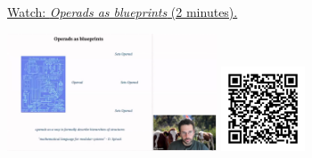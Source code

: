 
\begin{minipage}{10cm}
    \href{https://act4e-spring21.netlify.app/videos/spring2021-operads-b:operad-blueprint.html}{Watch: \emph{Operads as blueprints} (2 minutes).}
        
    \href{https://act4e-spring21.netlify.app/videos/spring2021-operads-b:operad-blueprint.html}{\includegraphics[height=3.5cm]{spring2021-operads-b:operad-blueprint/thumbnails.jpg}}
    \href{https://act4e-spring21.netlify.app/videos/spring2021-operads-b:operad-blueprint.html}{\includegraphics[height=2.5cm]{spring2021-operads-b:operad-blueprint/qrcode.png}}
\end{minipage}

